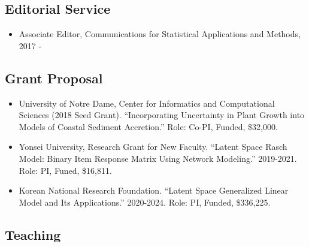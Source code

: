 \documentclass[
]{book}
\providecommand{\tightlist}{%
  \setlength{\itemsep}{0pt}\setlength{\parskip}{0pt}}
\begin{document}
\hypertarget{editorial-service}{%
\subsection*{Editorial Service}\label{editorial-service}}

\begin{itemize}
\tightlist
\item
  Associate Editor, Communications for Statistical Applications and Methods, 2017 -
\end{itemize}

\hypertarget{grant-proposal}{%
\subsection*{Grant Proposal}\label{grant-proposal}}

\begin{itemize}
\item
  University of Notre Dame, Center for Informatics and Computational Sciences (2018 Seed Grant). ``Incorporating Uncertainty in Plant Growth into Models of Coastal Sediment Accretion.'' Role: Co-PI, Funded, \$32,000.
\item
  Yonsei University, Research Grant for New Faculty. ``Latent Space Rasch Model: Binary Item Response Matrix Using Network Modeling.'' 2019-2021. Role: PI, Funed, \$16,811.
\item
  Korean National Research Foundation. ``Latent Space Generalized Linear Model and Its Applications.'' 2020-2024. Role: PI, Funded, \$336,225.
\end{itemize}

\hypertarget{teaching}{%
\subsection*{Teaching}\label{teaching}}
\end{document}
